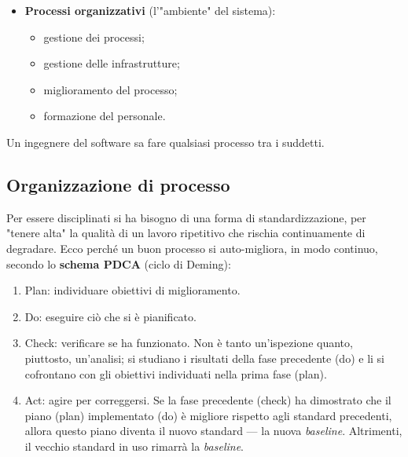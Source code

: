 \documentclass[a4paper]{article}
\begin{document}
\begin{itemize}
\begin{itemize}
	\end{itemize}

			
			
	\item \textbf{Processi organizzativi} (l'"ambiente" del sistema):
				
	\begin{itemize}
		
					
	\item gestione dei processi;
					
	\item gestione delle infrastrutture;
					
	\item miglioramento del processo;
					
	\item formazione del personale.
				
	\end{itemize}

			
		
	\end{itemize}

		
Un ingegnere del software sa fare qualsiasi processo tra i suddetti.

		
	\subsection{Organizzazione di processo}

		
Per essere disciplinati si ha bisogno di una forma di standardizzazione, per "tenere alta" la qualità di un lavoro ripetitivo che rischia continuamente di degradare. Ecco perché un buon processo si auto-migliora, in modo continuo, secondo lo \textbf{schema PDCA} (ciclo di Deming):
		
	\begin{enumerate}
		
			
	\item Plan: individuare obiettivi di miglioramento.
			
	\item Do: eseguire ciò che si è pianificato.
			
	\item Check: verificare se ha funzionato. Non è tanto un'ispezione quanto, piuttosto, un'analisi; si studiano i risultati della fase precedente (do) e li si cofrontano con gli obiettivi individuati nella prima fase (plan).
			
	\item Act: agire per correggersi. Se la fase precedente (check) ha dimostrato che il piano (plan) implementato (do) è migliore rispetto agli standard precedenti, allora questo piano diventa il nuovo standard --- la nuova \emph{baseline}. Altrimenti, il vecchio standard in uso rimarrà la \emph{baseline}.
		
	\end{enumerate}
\end{document}

